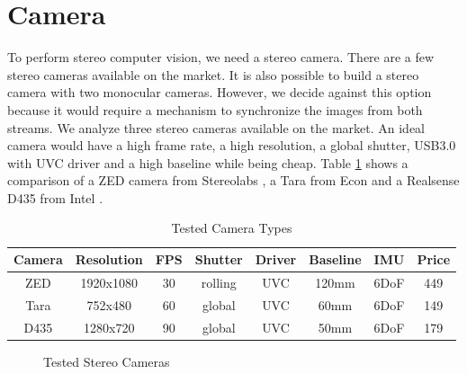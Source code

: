 \documentclass[11pt,a4paper,titlepage,oneside]{report}
\begin{document}
\section{Camera}

To perform stereo computer vision, we need a stereo camera. There are a few stereo cameras available on the market. It is also possible to build a stereo camera with two monocular cameras. However, we decide against this option because it would require a mechanism to synchronize the images from both streams. We analyze three stereo cameras available on the market. An ideal camera would have a high frame rate, a high resolution, a global shutter, USB3.0 with UVC driver and a high baseline while being cheap. Table \ref{tab:cameras} shows a comparison of a ZED camera from Stereolabs \cite{zed}, a Tara from Econ \cite{tara} and a Realsense D435 from Intel \cite{realsense}.

\tiny
\begin{table}[H]
  \centering
  \begin{tabular}{|c|c|c|c|c|c|c|c|}
  Camera & Resolution & FPS & Shutter & Driver & Baseline & IMU & Price \\
  \hline
  ZED & 1920x1080 & 30 & rolling &  UVC & 120mm & 6DoF & 449\\
  Tara & 752x480& 60 & global &  UVC &  60mm & 6DoF & 149\\
  D435 & 1280x720& 90 & global & UVC &  50mm & 6DoF & 179\\
\end{tabular}
\caption{Tested Camera Types}
\label{tab:cameras}
\end{table}
\normalsize

\begin{figure}[H]
  \centering
  \caption{Tested Stereo Cameras}\label{fig:cameras}
\end{figure}
\end{document}
